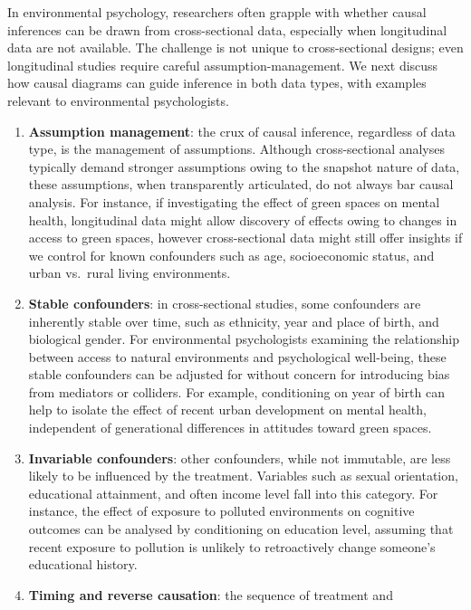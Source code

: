 \documentclass[
  singlecolumn]{article}
\begin{document}
In environmental psychology, researchers often grapple with whether
causal inferences can be drawn from cross-sectional data, especially
when longitudinal data are not available. The challenge is not unique to
cross-sectional designs; even longitudinal studies require careful
assumption-management. We next discuss how causal diagrams can guide
inference in both data types, with examples relevant to environmental
psychologists.

\begin{enumerate}
\def\labelenumi{\arabic{enumi}.}
\item
  \textbf{Assumption management}: the crux of causal inference,
  regardless of data type, is the management of assumptions. Although
  cross-sectional analyses typically demand stronger assumptions owing
  to the snapshot nature of data, these assumptions, when transparently
  articulated, do not always bar causal analysis. For instance, if
  investigating the effect of green spaces on mental health,
  longitudinal data might allow discovery of effects owing to changes in
  access to green spaces, however cross-sectional data might still offer
  insights if we control for known confounders such as age,
  socioeconomic status, and urban vs.~rural living environments.
\item
  \textbf{Stable confounders}: in cross-sectional studies, some
  confounders are inherently stable over time, such as ethnicity, year
  and place of birth, and biological gender. For environmental
  psychologists examining the relationship between access to natural
  environments and psychological well-being, these stable confounders
  can be adjusted for without concern for introducing bias from
  mediators or colliders. For example, conditioning on year of birth can
  help to isolate the effect of recent urban development on mental
  health, independent of generational differences in attitudes toward
  green spaces.
\item
  \textbf{Invariable confounders}: other confounders, while not
  immutable, are less likely to be influenced by the treatment.
  Variables such as sexual orientation, educational attainment, and
  often income level fall into this category. For instance, the effect
  of exposure to polluted environments on cognitive outcomes can be
  analysed by conditioning on education level, assuming that recent
  exposure to pollution is unlikely to retroactively change someone's
  educational history.
\item
  \textbf{Timing and reverse causation}: the sequence of treatment and

\end{enumerate}
\end{document}
